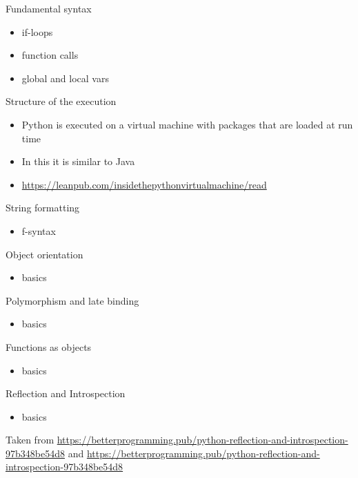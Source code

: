 \documentclass{beamer}
\begin{document}
\begin{frame}
{\centerline{Fundamental syntax}}
\begin{itemize}
    \item if-loops
    \item function calls
    \item global and local vars
\end{itemize} 
\end{frame}


\begin{frame}
{\centerline{Structure of the execution}}
\begin{itemize}
    \item Python is executed on a virtual machine with packages that are loaded at run time
    \item In this it is similar to Java
    \item \url{https://leanpub.com/insidethepythonvirtualmachine/read}
\end{itemize} 
\end{frame}

\begin{frame}
{\centerline{String formatting}}
\begin{itemize}
    \item f-syntax
\end{itemize} 
\end{frame}

\begin{frame}
{\centerline{Object orientation}}
\begin{itemize}
    \item basics
\end{itemize} 
\end{frame}


\begin{frame}
{\centerline{Polymorphism and late binding}}
\begin{itemize}
    \item basics
\end{itemize} 
\end{frame}


\begin{frame}
{\centerline{Functions as objects}}
\begin{itemize}
    \item basics
\end{itemize} 
\end{frame}

\begin{frame}
{\centerline{Reflection and Introspection}}
\begin{itemize}
    \item basics
\end{itemize} 
\begin{center}
    \tiny{Taken from \url{https://betterprogramming.pub/python-reflection-and-introspection-97b348be54d8} and \url{https://betterprogramming.pub/python-reflection-and-introspection-97b348be54d8}}
\end{center}

\end{frame}
\end{document}
